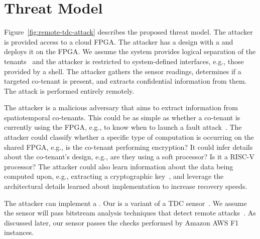 \section{Threat Model}
\label{threat_model}



Figure~\ref{fig:remote-tdc-attack} describes the proposed threat model. The attacker is provided access to a cloud FPGA. The attacker has a design with a \sensor and deploys it on the FPGA. We assume the system provides logical separation of the tenants~\cite{huffmire2007moats, mclean2007fpga} and the attacker is restricted to system-defined interfaces, e.g., those provided by a shell. The attacker gathers the sensor readings, determines if a targeted co-tenant is present, and extracts confidential information from them. The attack is performed entirely remotely.

% 




The attacker is a malicious adversary that aims to extract information from spatiotemporal co-tenants. This could be as simple as whether a co-tenant is currently using the FPGA, e.g., to know when to launch a fault attack~\cite{gnad2017voltage, krautter2018fpgahammer, sugawara2019oscillator}. The attacker could classify whether a specific type of computation is occurring on the shared FPGA, e.g., is the co-tenant performing encryption? It could infer details about the co-tenant’s design, e.g., are they using a soft processor? Is it a RISC-V processor? The attacker could also learn information about the data being computed upon, e.g., extracting a cryptographic key~\cite{zhao2018fpga, schellenberg2018inside, glamovcanin2020cloud}, and leverage the architectural details learned about implementation to increase recovery speeds.

The attacker can implement a \sensor. Our \sensor is a variant of a TDC sensor~\cite{zick2013sensing}.  %
We assume the sensor will pass bitstream analysis techniques that  detect remote attacks~\cite{krautter2019mitigating}. As discussed later, our sensor passes the checks performed by Amazon AWS F1 instances. %


